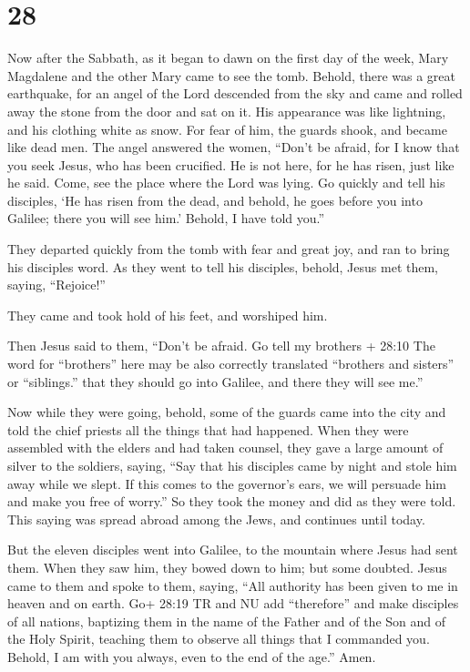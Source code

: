 \hypertarget{section-27}{%
\section{28}\label{section-27}}

 Now after the Sabbath, as it began to dawn on the first day
of the week, Mary Magdalene and the other Mary came to see the tomb.
 Behold, there was a great earthquake, for an angel of the
Lord descended from the sky and came and rolled away the stone from the
door and sat on it.  His appearance was like lightning, and
his clothing white as snow.  For fear of him, the guards
shook, and became like dead men.  The angel answered the
women, ``Don't be afraid, for I know that you seek Jesus, who has been
crucified.  He is not here, for he has risen, just like he
said. Come, see the place where the Lord was lying.  Go
quickly and tell his disciples, `He has risen from the dead, and behold,
he goes before you into Galilee; there you will see him.' Behold, I have
told you.''

 They departed quickly from the tomb with fear and great
joy, and ran to bring his disciples word.  As they went to
tell his disciples, behold, Jesus met them, saying, ``Rejoice!''

They came and took hold of his feet, and worshiped him.

 Then Jesus said to them, ``Don't be afraid. Go tell my
brothers + 28:10 The word for ``brothers'' here may be also correctly
translated ``brothers and sisters'' or ``siblings.'' that they should go
into Galilee, and there they will see me.''

 Now while they were going, behold, some of the guards came
into the city and told the chief priests all the things that had
happened.  When they were assembled with the elders and had
taken counsel, they gave a large amount of silver to the soldiers,
 saying, ``Say that his disciples came by night and stole
him away while we slept.  If this comes to the governor's
ears, we will persuade him and make you free of worry.'' 
So they took the money and did as they were told. This saying was spread
abroad among the Jews, and continues until today.

 But the eleven disciples went into Galilee, to the
mountain where Jesus had sent them.  When they saw him,
they bowed down to him; but some doubted.  Jesus came to
them and spoke to them, saying, ``All authority has been given to me in
heaven and on earth.  Go+ 28:19 TR and NU add ``therefore''
and make disciples of all nations, baptizing them in the name of the
Father and of the Son and of the Holy Spirit,  teaching
them to observe all things that I commanded you. Behold, I am with you
always, even to the end of the age.'' Amen.
